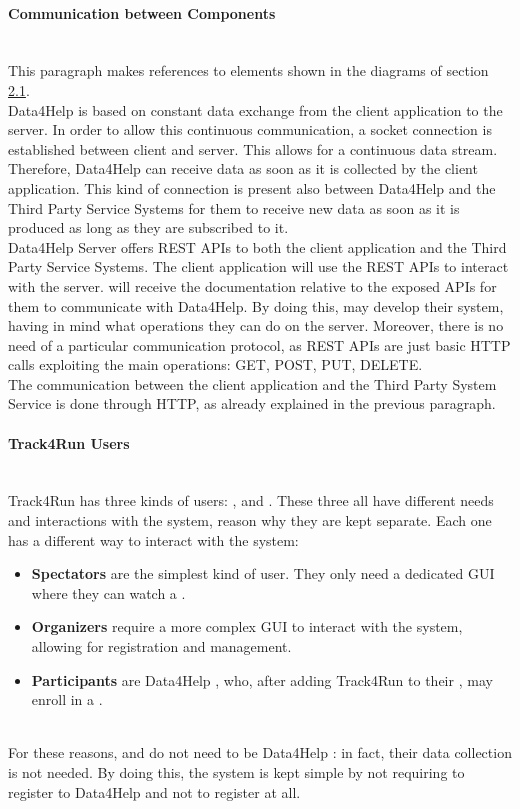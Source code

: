 \documentclass[../../DD.tex]{subfiles}
\begin{document}
	\paragraph{Communication between Components}\mbox{}\\
	This paragraph makes references to elements shown in the diagrams of section \hyperref[sect:2.1]{2.1}.\\
	Data4Help is based on constant data exchange from the client application to the server. In order to allow this continuous communication, a socket connection is established between client and server. This allows for a continuous data stream. Therefore, Data4Help can receive data as soon as it is collected by the client application. This kind of connection is present also between Data4Help and the Third Party Service Systems for them to receive new data as soon as it is produced as long as they are subscribed to it.\\
	Data4Help Server offers REST APIs to both the client application and the Third Party Service Systems. The client application will use the REST APIs to interact with the server.  will receive the documentation relative to the exposed APIs for them to communicate with Data4Help. By doing this,  may develop their system, having in mind what operations they can do on the server. Moreover, there is no need of a particular communication protocol, as REST APIs are just basic HTTP calls exploiting the main operations: GET, POST, PUT, DELETE.\\
	The communication between the client application and the Third Party System Service is done through HTTP, as already explained in the previous paragraph.

	\paragraph{Track4Run Users}\mbox{}\\
	Track4Run has three kinds of users: ,  and . These three all have different needs and interactions with the system, reason why they are kept separate. Each one has a different way to interact with the system:
	\begin{itemize}
		\item\textbf{Spectators} are the simplest kind of user. They only need a dedicated GUI where they can watch a .
		\item\textbf{Organizers} require a more complex GUI to interact with the system, allowing for registration and  management.
		\item\textbf{Participants} are Data4Help , who, after adding Track4Run to their , may enroll in a . 
	\end{itemize}\mbox{}\\
	For these reasons,  and  do not need to be Data4Help : in fact, their data collection is not needed. By doing this, the system is kept simple by not requiring  to register to Data4Help and  not to register at all.
\end{document}
